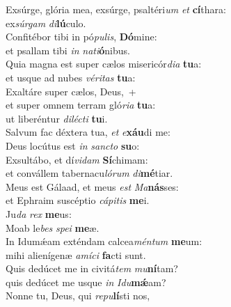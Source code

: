 \evenverse Exsúrge, glória mea, exsúrge, psaltéri\textit{um} \textit{et} \textbf{cí}thara:~\*\\
\evenverse ex\textit{súr}\textit{gam} \textit{di}\textbf{lú}culo.\\
\oddverse Confitébor tibi in pó\textit{pu}\textit{lis}, \textbf{Dó}mine:~\*\\
\oddverse et psallam tibi \textit{in} \textit{na}\textit{ti}\textbf{ó}nibus.\\
\evenverse Quia magna est super cælos misericór\textit{di}\textit{a} \textbf{tu}a:~\*\\
\evenverse et usque ad nubes \textit{vé}\textit{ri}\textit{tas} \textbf{tu}a:\\
\oddverse Exaltáre super cælos, Deus,~+\\
\oddverse  et super omnem terram gló\textit{ri}\textit{a} \textbf{tu}a:~\*\\
\oddverse ut liberéntur \textit{di}\textit{lé}\textit{cti} \textbf{tu}i.\\
\evenverse Salvum fac déxtera tua, \textit{et} \textit{e}\textbf{xáu}di me:~\*\\
\evenverse Deus locútus est \textit{in} \textit{san}\textit{cto} \textbf{su}o:\\
\oddverse Exsultábo, et dí\textit{vi}\textit{dam} \textbf{Sí}chimam:~\*\\
\oddverse et convállem tabernacu\textit{ló}\textit{rum} \textit{di}\textbf{mé}tiar.\\
\evenverse Meus est Gálaad, et meus \textit{est} \textit{Ma}\textbf{nás}ses:~\*\\
\evenverse et Ephraim suscéptio \textit{cá}\textit{pi}\textit{tis} \textbf{me}i.\\
\oddverse Ju\textit{da} \textit{rex} \textbf{me}us:~\*\\
\oddverse Moab le\textit{bes} \textit{spe}\textit{i} \textbf{me}æ.\\
\evenverse In Idumǽam exténdam calcea\textit{mén}\textit{tum} \textbf{me}um:~\*\\
\evenverse mihi alienígenæ \textit{a}\textit{mí}\textit{ci} \textbf{fa}cti sunt.\\
\oddverse Quis dedúcet me in civitá\textit{tem} \textit{mu}\textbf{ní}tam?~\*\\
\oddverse quis dedúcet me usque \textit{in} \textit{I}\textit{du}\textbf{mǽ}am?\\
\evenverse Nonne tu, Deus, qui \textit{re}\textit{pu}\textbf{lí}sti nos,~\*\\
